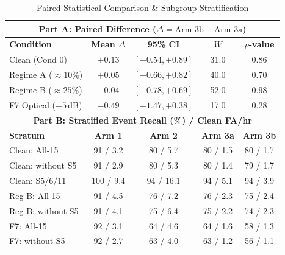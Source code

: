 \begin{table}[htbp]
\caption{Paired Statistical Comparison \& Subgroup Stratification}
\label{tab:statistical_and_strata}
\centering
\scriptsize
\renewcommand{\arraystretch}{0.70}
\setlength{\tabcolsep}{2.5pt}
\begin{tabular}{|l|c|c|c|c|}
\hline
\multicolumn{5}{|c|}{\textbf{Part A: Paired Difference ($\Delta = \text{Arm 3b} - \text{Arm 3a}$)}} \\
\hline
\textbf{Condition} & \textbf{Mean $\Delta$} & \textbf{95\% CI} & \textbf{$W$} & \textbf{$p$-value} \\
\hline
Clean (Cond 0)       & $+0.13$ & $[-0.54, +0.89]$ & 31.0 & $0.86$ \\
Regime A ($\approx 10\%$) & $+0.05$ & $[-0.66, +0.82]$ & 40.0 & $0.70$ \\
Regime B ($\approx 25\%$) & $-0.04$ & $[-0.78, +0.69]$ & 52.0 & $0.98$ \\
F7 Optical ($+5$\,dB)& $-0.49$ & $[-1.47, +0.38]$ & 17.0 & $0.28$ \\
\hline
\multicolumn{5}{|c|}{\textbf{Part B: Stratified Event Recall (\%) / Clean FA/hr}} \\
\hline
\textbf{Stratum} & \textbf{Arm 1} & \textbf{Arm 2} & \textbf{Arm 3a} & \textbf{Arm 3b} \\
\hline
Clean: All-15      & 91 / 3.2  & 80 / 5.7  & 80 / 1.5  & 80 / 1.7  \\
Clean: without S5   & 91 / 2.9  & 80 / 5.3  & 80 / 1.4  & 79 / 1.7  \\
Clean: S5/6/11     & 100 / 9.4 & 94 / 16.1 & 94 / 5.1  & 94 / 3.9  \\
\hline
Reg B: All-15      & 91 / 4.5  & 76 / 7.2  & 76 / 2.3  & 75 / 2.4  \\
Reg B: without S5   & 91 / 4.1  & 75 / 6.4  & 75 / 2.2  & 74 / 2.3  \\
\hline
F7: All-15         & 92 / 3.1  & 64 / 4.6  & 64 / 1.6  & 58 / 1.3  \\
F7: without S5      & 92 / 2.7  & 63 / 4.0  & 63 / 1.2  & 56 / 1.1  \\
\hline
\end{tabular}
\end{table}
